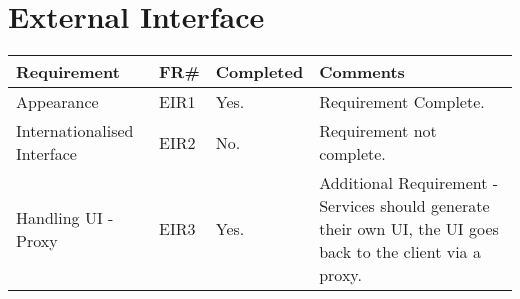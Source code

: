\section{External Interface}
\begin{tabular}{ |p{5cm}|l|l|p{8cm}|}
\hline
\textbf{Requirement}	&	\textbf{FR\#}	&	\textbf{Completed}	&	\textbf{Comments} \\
\hline
Appearance & EIR1 & Yes. & Requirement Complete. \\
\hline
Internationalised Interface & EIR2 & No. & Requirement not complete. \\
\hline
Handling UI - Proxy & EIR3 & Yes. & Additional Requirement - Services should generate their own UI, the UI goes back to the client via a proxy. \\
\hline
\end{tabular}